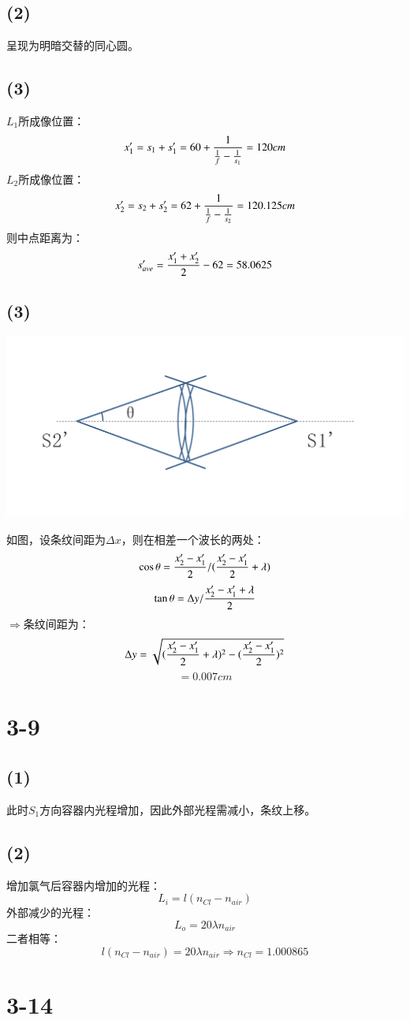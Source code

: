 \documentclass[UTF8,9pt]{ctexart}
\begin{document}
\subsection{(2)}
呈现为明暗交替的同心圆。
\subsection{(3)}
$L_1$所成像位置：
$$x'_1=s_1+s'_1=60+\frac{1}{\frac{1}{f}-\frac{1}{s_1}}=120cm$$
$L_2$所成像位置：
$$x'_2=s_2+s'_2=62+\frac{1}{\frac{1}{f}-\frac{1}{s_2}}=120.125cm$$
则中点距离为：
$$s'_{ave}=\frac{x'_1+x'_2}{2}-62=58.0625$$
\subsection{(3)}
\begin{center}
	\includegraphics[scale=0.4]{3.png}\\
\end{center}
如图，设条纹间距为$\Delta x$，则在相差一个波长的两处：
$$\cos\theta=\frac{x_2'-x_1'}{2}/(\frac{x_2'-x_1'}{2}+\lambda)$$
$$\tan\theta=\Delta y/\frac{x_2'-x_1'+\lambda}{2}$$
$\Rightarrow $条纹间距为：
$$\Delta y=\sqrt{(\frac{x_2'-x_1'}{2}+\lambda)^2-(\frac{x_2'-x_1'}{2})^2}$$
$$=0.007cm$$
\section{3-9}
\subsection{(1)}
此时$S_1$方向容器内光程增加，因此外部光程需减小，条纹上移。
\subsection{(2)}
增加氯气后容器内增加的光程：
$$L_i=l(n_{Cl}-n_{air})$$
外部减少的光程：
$$L_o=20\lambda n_{air}$$
二者相等：
$$l(n_{Cl}-n_{air})=20\lambda n_{air} \Rightarrow n_{Cl}=1.000865$$
\section{3-14}
\end{document}
